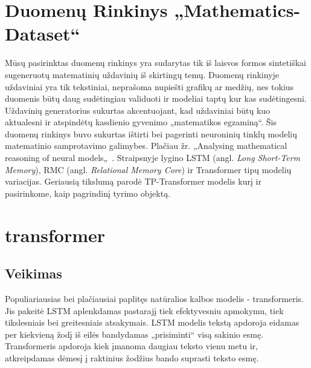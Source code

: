 \documentclass[conference]{IEEEtran}
\begin{document}
\section{Duomenų Rinkinys „Mathematics-Dataset“}


Mūsų pasirinktas duomenų rinkinys yra sudarytas tik iš laisvos formos sintetiškai sugeneruotų matematinių uždavinių iš skirtingų temų. Duomenų rinkinyje uždaviniai yra tik tekstiniai, neprašoma nupiešti grafikų ar medžių, nes tokius duomenis būtų daug sudėtingiau validuoti ir modeliai taptų kur kas sudėtingesni. Uždavinių generatorius sukurtas akcentuojant, kad uždaviniai būtų kuo aktualesni ir atspindėtų kasdienio gyvenimo „matematikos egzaminą“. Šis duomenų rinkinys buvo sukurtas ištirti bei pagerinti neuroninių tinklų modelių matematinio samprotavimo galimybes. Plačiau žr. „Analysing mathematical reasoning of neural models„~\cite{deeplab}. Straipsnyje lygino LSTM (angl. \textit{Long Short-Term Memory}), RMC (angl. \textit{Relational Memory Core}) ir Transformer tipų modelių variacijas. Geriausią tikslumą parodė TP-Transformer modelis kurį ir pasirinkome, kaip pagrindinį tyrimo objektą.






\section{transformer}

\subsection{Veikimas}
Populiariausias bei plačiausiai paplitęs natūralios kalbos modelis - transformeris. Jis pakeitė LSTM aplenkdamas pastarajį tiek efektyvesniu apmokymu, tiek tikslesniais bei greitesniais atsakymais. LSTM modelis tekstą apdoroja eidamas per kiekvieną žodį iš eilės bandydamas „prisiminti“ visą sakinio esmę. Transformeris apdoroja kiek įmanoma daugiau teksto vienu metu ir, atkreipdamas dėmesį į raktinius žodžius bando suprasti teksto esmę.
\end{document}
